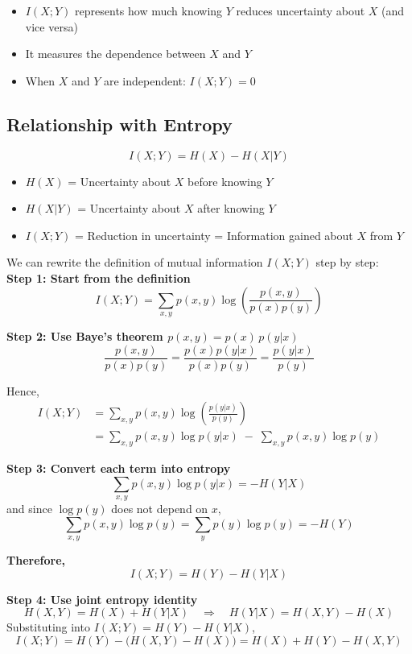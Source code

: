 \documentclass[11pt,a4paper]{book}
\newenvironment{formulabox}[1][Formula]{
    \begin{tcolorbox}[
        enhanced,
        breakable,
        colback=softcoral!10,
        colframe=softcoral!200,
        title=#1,
        fonttitle=\bfseries,
        coltitle=white,
        sharp corners,
        boxrule=1pt,
        left=8pt,
        right=8pt,
        top=6pt,
        bottom=6pt
    ]
}{
    \end{tcolorbox}
}
\newenvironment{infobox}[1][Information]{
    \begin{tcolorbox}[
        enhanced,
        breakable,
        colback=mintgreen!10,
        colframe=mintgreen!200,
        title=#1,
        fonttitle=\bfseries,
        sharp corners,
        boxrule=0.8pt,
        left=8pt,
        right=8pt,
        top=6pt,
        bottom=6pt
    ]
}{
    \end{tcolorbox}
}
\newenvironment{derivationbox}[1][Derivation]{
    \begin{tcolorbox}[
        enhanced,
        breakable,
        colback=softpeach!10,
        colframe=softpeach!200,
        title=#1,
        fonttitle=\bfseries,
        sharp corners,
        boxrule=0.8pt,
        left=10pt,
        right=10pt,
        top=8pt,
        bottom=8pt
    ]
}{
    \end{tcolorbox}
}
\begin{document}
\begin{infobox}[Interpretation of Mutual Information]
    \begin{itemize}
        \item \(I(X;Y)\) represents how much knowing \(Y\) reduces uncertainty about \(X\) (and vice versa)
        \item It measures the dependence between \(X\) and \(Y\)
        \item When \(X\) and \(Y\) are independent: \(I(X;Y) = 0\)
    \end{itemize}
\end{infobox}

\subsection{Relationship with Entropy}

\begin{formulabox}
    \[
        I(X;Y) = H(X) - H(X|Y)
    \]
    \begin{itemize}
        \item \(H(X)\) = Uncertainty about \(X\) before knowing \(Y\)
        \item \(H(X|Y)\) = Uncertainty about \(X\) after knowing \(Y\)
        \item \(I(X;Y)\) = Reduction in uncertainty = Information gained about \(X\) from \(Y\)
    \end{itemize}
\end{formulabox}

\begin{derivationbox}[Derivation: I(X;Y) = H(X) - H(X|Y)]
    We can rewrite the definition of mutual information \(I(X;Y)\) step by step:
\medskip\\
    \textbf{Step 1: Start from the definition}
\[
I(X;Y)=\sum_{x,y} p(x,y)\log\left(\frac{p(x,y)}{p(x)p(y)}\right)
\]

\textbf{Step 2: Use Baye's theorem \(p(x,y)=p(x)\,p(y|x)\)}
\[
\frac{p(x,y)}{p(x)p(y)}
=\frac{p(x)p(y|x)}{p(x)p(y)}
=\frac{p(y|x)}{p(y)}
\]

Hence,
\begin{align*}
I(X;Y)
&=\sum_{x,y} p(x,y)\log\left(\frac{p(y|x)}{p(y)}\right)\\[6pt]
&=\sum_{x,y} p(x,y)\log p(y|x)\;-\;\sum_{x,y} p(x,y)\log p(y)
\end{align*}

\textbf{Step 3: Convert each term into entropy}
\[
\sum_{x,y} p(x,y)\log p(y|x) = -H(Y|X)
\]
and since \(\log p(y)\) does not depend on \(x\),
\[
\sum_{x,y} p(x,y)\log p(y)=\sum_y p(y)\log p(y)=-H(Y)
\]

\textbf{Therefore,}
\[
\boxed{I(X;Y)=H(Y)-H(Y|X)}
\]

    \textbf{Step 4: Use joint entropy identity}
    \[
        H(X,Y)=H(X)+H(Y|X)
        \quad\Rightarrow\quad
        H(Y|X)=H(X,Y)-H(X)
    \]
    Substituting into \(I(X;Y)=H(Y)-H(Y|X)\),
    \[
        I(X;Y)=H(Y)-\big(H(X,Y)-H(X)\big)
        =\boxed{H(X)+H(Y)-H(X,Y)}
    \]
\end{derivationbox}
\end{document}
